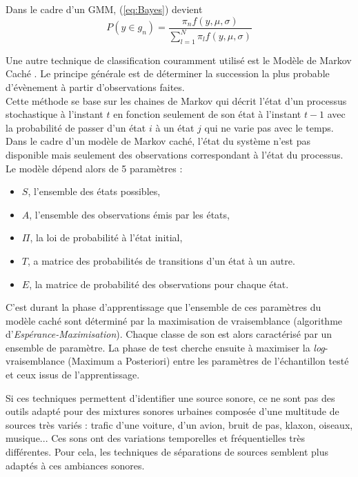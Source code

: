 Dans le cadre d'un GMM, (\ref{eq:Bayes}) devient 
\begin{equation}
P(y \in g_n) = \frac{\pi_n f(y,\mu,\sigma)}{\sum_{l = 1}^N \pi_l f(y,\mu, \sigma)}
\end{equation}

Une autre technique de classification couramment utilisé est le Modèle de Markov Caché \cite{Rabiner}. Le principe générale est de déterminer la succession la plus probable d'évènement à partir d'observations faites.\\
Cette méthode se base sur les chaines de Markov qui décrit l'état d'un processus stochastique à l'instant $t$ en fonction seulement de son état à l'instant $t-1$ avec la probabilité de passer d'un état $i$ à un état $j$ qui ne varie pas avec le temps.\\

Dans le cadre d'un modèle de Markov caché, l'état du système n'est pas disponible mais seulement des observations correspondant à l'état du processus. Le modèle dépend alors de 5 paramètres : 

\begin{itemize}
\item $S$, l'ensemble des états possibles,
\item $A$, l'ensemble des observations émis par les états,
\item $\Pi$, la loi de probabilité à l'état initial,
\item $T$, a matrice des probabilités de transitions d'un état à un autre.
\item $E$, la matrice de probabilité des observations pour chaque état.\\
\end{itemize}

C'est durant la phase d'apprentissage que l'ensemble de ces paramètres du modèle caché sont déterminé par la maximisation de vraisemblance (algorithme d'\textit{Espérance-Maximisation}). Chaque classe de son est alors caractérisé par un ensemble de paramètre. La phase de test cherche ensuite à maximiser la \textit{log}-vraisemblance (Maximum a Posteriori) entre les paramètres de l'échantillon testé et ceux issus de l'apprentissage.

Si ces techniques permettent d'identifier une source sonore, ce ne sont pas des outils adapté pour des mixtures sonores urbaines composée d'une multitude de sources très variés : trafic d'une voiture, d'un avion, bruit de pas, klaxon, oiseaux, musique... Ces sons ont des variations temporelles et fréquentielles très différentes. Pour cela, les techniques de séparations de sources semblent plus adaptés à ces ambiances sonores.

